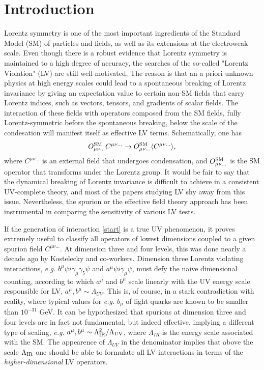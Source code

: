 \documentclass[12pt,preprintnumbers,nofootinbib]{revtex4}
\begin{document}
\section{Introduction}

	
	Lorentz symmetry is one of the most important ingredients of the 
	Standard Model (SM) of particles and fields, as well as its extensions at the 
electroweak scale. Even though there is a robust evidence that Lorentz symmetry is maintained to a 
high degree of accuracy, the searches of the so-called "Lorentz Violation" (LV) 
are still well-motivated. The reason is that an a priori unknown physics at high 
energy scales could lead to a spontaneous breaking of Lorentz invariance by 
giving an expectation value to certain non-SM fields 
that carry Lorentz indices, such as vectors, 
tensors, and gradients of scalar fields. The interaction of these fields with  operators composed 
from the SM fields, fully Lorentz-symmetric before the spontaneous breaking, below the 
scale of the condesation will manifest itself as effective LV terms. Schematically, one 
has 
\begin{equation}
O^{\rm SM}_{\mu\nu...} C^{\mu\nu...} \to O^{\rm SM}_{\mu\nu...} \langle C^{\mu\nu...} \rangle,
\label{start}
\end{equation}
where $C^{\mu\nu...}$ is an external field that undergoes condensation, and 
$O^{\rm SM}_{\mu\nu...} $ is the SM operator that transforms under 
the Lorentz group. It would be fair to say that the dynamical breaking of Lorentz 
invariance is difficult to achieve in a consistent UV-complete theory, and most of the 
papers studying LV shy away from this issue. 
 Nevertheless, the spurion or the effective field theory approach has been instrumental in 
comparing the sensitivity of various LV tests. 
	
If the generation of interaction \eqref{start} is a true UV phenomenon, it proves extremely useful 
to classify all operators of lowest dimensions coupled to a given spurion field $	C^{\mu\nu...}$.
At dimension three and four levels, this was done nearly a decade ago by Kostelecky and co-workers. 
Dimension three Lorentz violating interactions, {\em e.g.} $b^\mu \psi i\gamma_\mu\gamma_5\psi$ and 
 $a^\mu \psi i\gamma_\mu\psi$, must defy the naive dimensional counting, according to which $
 a^\mu$ and $b^\mu$ scale linearly with the UV energy scale responsible for LV, 
$a^\mu,b^\mu \sim \Lambda_{UV}$. This is, of course, in a stark contradiction with reality, 
where typical values for {\em e.g.} $b_\mu$ of light quarks are known to be smaller than 
$10^{-31}$ GeV. It can be hypothesized that spurions at dimension three and four levels are in fact 
not fundamental, but indeed effective, implying a different type of scaling, {\em e.g.} 
$a^\mu,b^\mu \sim \Lambda_{\rm IR}^2/\Lambda_{\rm UV}$, where $\Lambda_{IR}$ is the energy scale 
associated with the SM. The appearence of $\Lambda_{UV}$ in the denominator implies that above the 
scale $\Lambda_{\rm IR}$ one should be able to formulate all LV interactions in terms of the  
{\em higher-dimensional} LV operators.  
\end{document}
